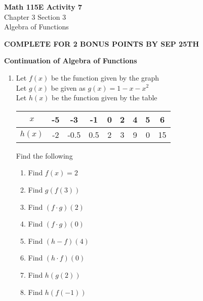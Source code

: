 \documentclass{article}
\begin{document}
\begin{center}
    \Large \textbf{Math 115E Activity 7} \\
    \vspace{0.2cm}
    \normalsize Chapter 3 Section 3 \\
    \normalsize Algebra of Functions
\end{center}
\hspace{4cm} \textbf{COMPLETE FOR 2 BONUS POINTS BY SEP 25TH}

\vspace{0.5cm}
\textbf{Continuation of Algebra of Functions}

\noindent
\begin{minipage}[c]{0.60\textwidth}
    \begin{enumerate}
        \vspace{0.5cm}
        \item Let $f(x)$ be the function given by the graph \\
              Let $g(x)$ be given as $g(x)=1-x-x^2$ \\
              Let $h(x)$ be the function given by the table
              \begin{center}
                \raggedright
                \begin{tabular}{|c||c|c|c|c|c|c|c|c|}
                    \hline
                    $x$ & -5 & -3 & -1 & 0 & 2 & 4 & 5 & 6 \\
                    \hline
                    $h(x)$ & -2 & -0.5 & 0.5 & 2 & 3 & 9 & 0 & 15 \\
                    \hline
                \end{tabular}
        \end{center}
              Find the following
              \begin{enumerate}
                \item Find $f(x)=2$
                \vspace{1.2cm}
                \item Find $g(f(3))$
                \vspace{1.2cm}
                \item Find $(f \cdot g)(2)$
                \vspace{1.2cm}
                \item Find $(f \cdot g)(0)$
                \vspace{1.2cm}
                \item Find $(h-f)(4)$
                \vspace{1.2cm}
                \item Find $(h \cdot f)(0)$
                \vspace{1.2cm}
                \item Find $h(g(2))$
                \vspace{1.2cm}
                \item Find $h(f(-1))$
                \vspace{1.2cm}
                
              \end{enumerate}
        \end{enumerate}
\end{minipage}%
\end{document}
